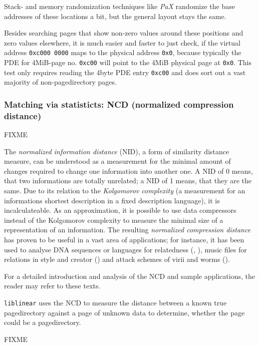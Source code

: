 Stack- and memory randomization techniques like \emph{PaX} randomize the base
addresses of these locations a bit, but the general layout stays the same.

Besides searching pages that show non-zero values around these positions and
zero values elsewhere, it is much easier and faster to just check, if the
virtual address \texttt{0xc000~0000} maps to the physical address \texttt{0x0},
because typically the PDE for 4MiB-page no. \texttt{0xc00} will point to the
4MiB physical page at \texttt{0x0}. This test only requires reading the 4byte
PDE entry \texttt{0xc00} and does sort out a vast majority of non-pagedirectory
pages.



\subsubsection{Matching via statisticts: NCD (normalized compression distance)}

FIXME

The \emph{normalized information distance} (NID), a form of similarity distance
measure, can be understood as a measurement for the minimal amount of changes
required to change one information into another one.  A NID of 0 means, that two
informations are totally unrelated; a NID of 1 means, that they are the same.
Due to its relation to the \emph{Kolgomorov complexity} (a measurement for an
informations shortest description in a fixed description language), it is
incalculateable.  As an approximation, it is possible to use data compressors
instead of the Kolgomorov complexity to measure the minimal size of a
representation of an information. The resulting \emph{normalized compression
distance} has proven to be useful in a vast area of applications; for instance,
it has been used to analyse DNA sequences or languages for relatedness
(\cite{clustering_by_compression:2005}, \cite{similarity_matrix:2004}), music
files for relations in style and creator (\cite{clustering_by_compression:2005})
and attack schemes of virii and worms (\cite{analysing_worms_with_ncd:2006}).

For a detailed introduction and analysis of the NCD and sample applications, the
reader may refer to these texts.

\texttt{liblinear} uses the NCD to measure the distance between a known true
pagedirectory against a page of unknown data to determine, whether the page
could be a pagedirectory.

FIXME

